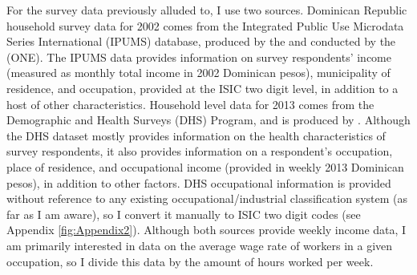 \documentclass[12pt]{article}
\begin{document}
For the survey data previously alluded to, I use two sources. 
Dominican Republic household survey data for 2002 comes from the 
Integrated Public Use Microdata Series International
(IPUMS) database, produced by the \citet{ipumsi} and conducted by the
\citet{one} (ONE). The IPUMS data provides information on 
survey respondents' income (measured as monthly total income in
2002 Dominican pesos), municipality of residence, and occupation,
provided at the ISIC two digit level, in addition to a host of other characteristics.
Household level data for 2013 comes from the 
Demographic and Health Surveys (DHS) Program, and is produced by \citet{dhs}.
Although the DHS dataset mostly provides information on the health 
characteristics of survey respondents, it also provides 
information on a respondent's occupation, place of residence,
and occupational income (provided in weekly 2013 Dominican pesos), in addition to other factors. 
DHS occupational information is provided without reference to any existing occupational/industrial 
classification system (as far as I am aware), so I convert it manually to
ISIC two digit codes (see Appendix \ref{fig:Appendix2}).
Although both sources provide weekly income data, I am primarily interested in data
on the average wage rate of workers in a given occupation, so I divide this data by the amount of
hours worked per week. %
\end{document}
